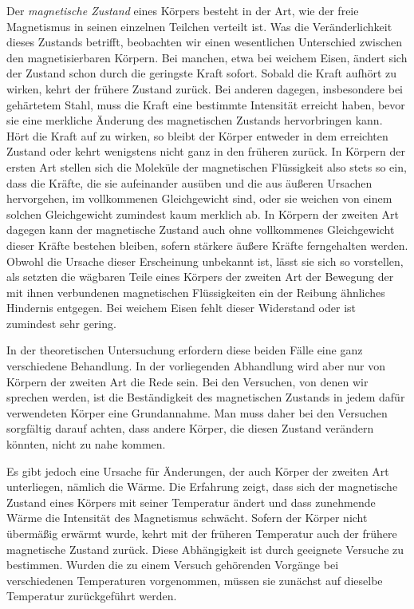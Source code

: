 Der \textit{magnetische Zustand} eines Körpers besteht in der Art, wie der freie Magnetismus in seinen einzelnen Teilchen verteilt ist. Was die Veränderlichkeit dieses Zustands betrifft, beobachten wir einen wesentlichen Unterschied zwischen den magnetisierbaren Körpern. Bei manchen, etwa bei weichem Eisen, ändert sich der Zustand schon durch die geringste Kraft sofort. Sobald die Kraft aufhört zu wirken, kehrt der frühere Zustand zurück. Bei anderen dagegen, insbesondere bei gehärtetem Stahl, muss die Kraft eine bestimmte Intensität erreicht haben, bevor sie eine merkliche Änderung des magnetischen Zustands hervorbringen kann. Hört die Kraft auf zu wirken, so bleibt der Körper entweder in dem erreichten Zustand oder kehrt wenigstens nicht ganz in den früheren zurück. In Körpern der ersten Art stellen sich die Moleküle der magnetischen Flüssigkeit also stets so ein, dass die Kräfte, die sie aufeinander ausüben und die aus äußeren Ursachen hervorgehen, im vollkommenen Gleichgewicht sind, oder sie weichen von einem solchen Gleichgewicht zumindest kaum merklich ab. In Körpern der zweiten Art dagegen kann der magnetische Zustand auch ohne vollkommenes Gleichgewicht dieser Kräfte bestehen bleiben, sofern stärkere äußere Kräfte ferngehalten werden. Obwohl die Ursache dieser Erscheinung unbekannt ist, lässt sie sich so vorstellen, als setzten die wägbaren Teile eines Körpers der zweiten Art der Bewegung der mit ihnen verbundenen magnetischen Flüssigkeiten ein der Reibung ähnliches Hindernis entgegen. Bei weichem Eisen fehlt dieser Widerstand oder ist zumindest sehr gering.

In der theoretischen Untersuchung erfordern diese beiden Fälle eine ganz verschiedene Behandlung. In der vorliegenden Abhandlung wird aber nur von Körpern der zweiten Art die Rede sein. Bei den Versuchen, von denen wir sprechen werden, ist die Beständigkeit des magnetischen Zustands in jedem dafür verwendeten Körper eine Grundannahme. Man muss daher bei den Versuchen sorgfältig darauf achten, dass andere Körper, die diesen Zustand verändern könnten, nicht zu nahe kommen.

Es gibt jedoch eine Ursache für Änderungen, der auch Körper der zweiten Art unterliegen, nämlich die Wärme. Die Erfahrung zeigt, dass sich der magnetische Zustand eines Körpers mit seiner Temperatur ändert und dass zunehmende Wärme die Intensität des Magnetismus schwächt. Sofern der Körper nicht übermäßig erwärmt wurde, kehrt mit der früheren Temperatur auch der frühere magnetische Zustand zurück. Diese Abhängigkeit ist durch geeignete Versuche zu bestimmen. Wurden die zu einem Versuch gehörenden Vorgänge bei verschiedenen Temperaturen vorgenommen, müssen sie zunächst auf dieselbe Temperatur zurückgeführt werden.
